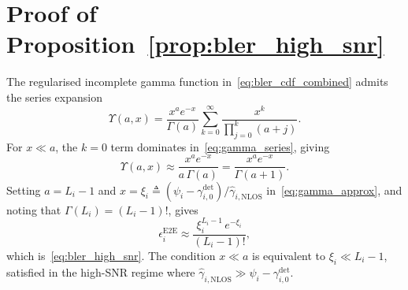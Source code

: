 \documentclass[lettersize,journal]{IEEEtran}
\begin{document}
\section{Proof of Proposition~\ref{prop:bler_high_snr}}
\label{app:proof_bler_high_snr}
The regularised incomplete gamma function in~\eqref{eq:bler_cdf_combined} admits the series expansion
\begin{equation}
\Upsilon(a,x)=\frac{x^a e^{-x}}{\Gamma(a)}\sum_{k=0}^{\infty}\frac{x^k}{\prod_{j=0}^{k}(a+j)}.
\label{eq:gamma_series}
\end{equation}
For $x\ll a$, the $k=0$ term dominates in~\eqref{eq:gamma_series}, giving
\begin{equation}
\Upsilon(a,x)\approx\frac{x^a e^{-x}}{a\,\Gamma(a)}=\frac{x^a e^{-x}}{\Gamma(a+1)}.
\label{eq:gamma_approx}
\end{equation}
Setting $a=L_i-1$ and $x=\xi_i\triangleq(\psi_i-\gamma_{i,0}^{\mathrm{det}})/\hat{\gamma}_{i,\mathrm{NLOS}}$ in~\eqref{eq:gamma_approx}, and noting that $\Gamma(L_i)=(L_i-1)!$, gives
\begin{equation}
\epsilon_i^{\mathrm{E2E}}\approx\frac{\xi_i^{L_i-1}\,e^{-\xi_i}}{(L_i-1)!},
\end{equation}
which is~\eqref{eq:bler_high_snr}. The condition $x\ll a$ is equivalent to $\xi_i\ll L_i-1$, satisfied in the high-SNR regime where $\hat{\gamma}_{i,\mathrm{NLOS}}\gg\psi_i-\gamma_{i,0}^{\mathrm{det}}$.
\end{document}
